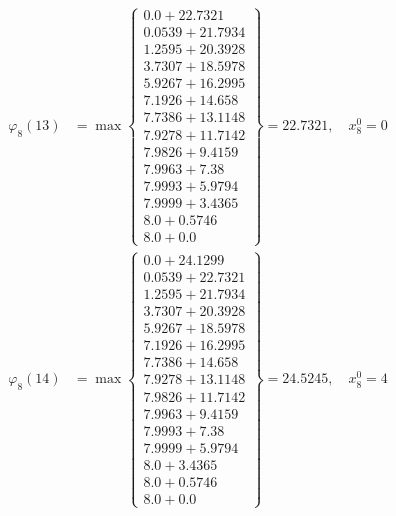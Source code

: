 \documentclass{article}
\begin{document}
\begin{align*}
  
  
  
\varphi_{8}(13) &= \max \left\{ \begin{array}{c}
0.0 + 22.7321 \\
 0.0539 + 21.7934 \\
 1.2595 + 20.3928 \\
 3.7307 + 18.5978 \\
 5.9267 + 16.2995 \\
 7.1926 + 14.658 \\
 7.7386 + 13.1148 \\
 7.9278 + 11.7142 \\
 7.9826 + 9.4159 \\
 7.9963 + 7.38 \\
 7.9993 + 5.9794 \\
 7.9999 + 3.4365 \\
 8.0 + 0.5746 \\
 8.0 + 0.0
\end{array} \right\}=22.7321,\quad x_{8}^0=0\\
  
  
  
  
\varphi_{8}(14) &= \max \left\{ \begin{array}{c}
0.0 + 24.1299 \\
 0.0539 + 22.7321 \\
 1.2595 + 21.7934 \\
 3.7307 + 20.3928 \\
 5.9267 + 18.5978 \\
 7.1926 + 16.2995 \\
 7.7386 + 14.658 \\
 7.9278 + 13.1148 \\
 7.9826 + 11.7142 \\
 7.9963 + 9.4159 \\
 7.9993 + 7.38 \\
 7.9999 + 5.9794 \\
 8.0 + 3.4365 \\
 8.0 + 0.5746 \\
 8.0 + 0.0
\end{array} \right\}=24.5245,\quad x_{8}^0=4\\
  
  
  

\end{align*}
\end{document}
